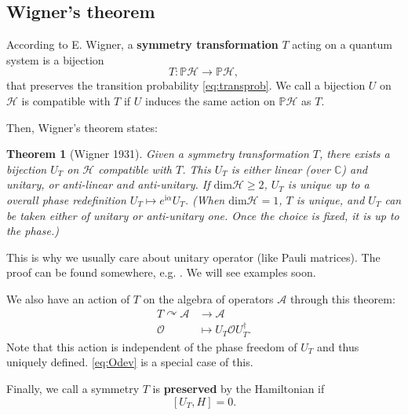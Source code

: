 \documentclass[
]{scrartcl}
\numberwithin{equation}{section}
\renewenvironment{align}{\begin{equation}\begin{aligned}}{\end{aligned}\end{equation}}
\newtheorem{theorem}{Theorem}[section]
\theoremstyle{definition}
\theoremstyle{definition}
\theoremstyle{definition}
\theoremstyle{definition}
\theoremstyle{remark}
\begin{document}
\hypertarget{wigners-theorem}{%
\subsection{Wigner's theorem}\label{wigners-theorem}}

According to E. Wigner, a \textbf{symmetry transformation} \(T\) acting on a quantum system is a bijection
\begin{equation}
  \label{eq:sym}
  T: \mathbb{P}\mathcal{H} \to \mathbb{P}\mathcal{H},
\end{equation}
that preserves the transition probability \eqref{eq:transprob}.
We call a bijection \(U\) on \(\mathcal{H}\) is compatible with \(T\) if \(U\) induces the same action on \(\mathbb{P}\mathcal{H}\) as \(T\).

Then, Wigner's theorem states:

\begin{theorem}[Wigner 1931]
Given a symmetry transformation \(T\), there exists a bijection \(U_T\) on \(\mathcal{H}\) compatible with \(T\).
This \(U_T\) is either linear (over \(\mathbb{C}\)) and unitary, or anti-linear and anti-unitary. If \(\mathrm{dim}\mathcal{H}\ge 2\), \(U_T\) is unique up to a overall phase redefinition \(U_T \mapsto e^{\mathrm{i}\alpha}U_T\). (When \(\mathrm{dim}\mathcal{H} = 1\), \(T\) is unique, and \(U_T\) can be taken either of unitary or anti-unitary one. Once the choice is fixed, it is up to the phase.)
\end{theorem}

This is why we usually care about unitary operator (like Pauli matrices).
The proof can be found somewhere, e.g. \textcite{Weinberg:1995mt}. We will see examples soon.

We also have an action of \(T\) on the algebra of operators \(\mathcal{A}\) through this theorem:
\begin{align}
  \label{eq:TonA}
  T \curvearrowright \mathcal{A}  & \to \mathcal{A} \\
  \mathcal{O} & \mapsto U_T \mathcal{O} U^\dagger_T.
\end{align}
Note that this action is independent of the phase freedom of \(U_T\) and thus uniquely defined.
\eqref{eq:Odev} is a special case of this.

Finally, we call a symmetry \(T\) is \textbf{preserved} by the Hamiltonian if
\begin{equation}
  \label{eq:UHcommute}
  [U_T,H] = 0.
\end{equation}
\end{document}
